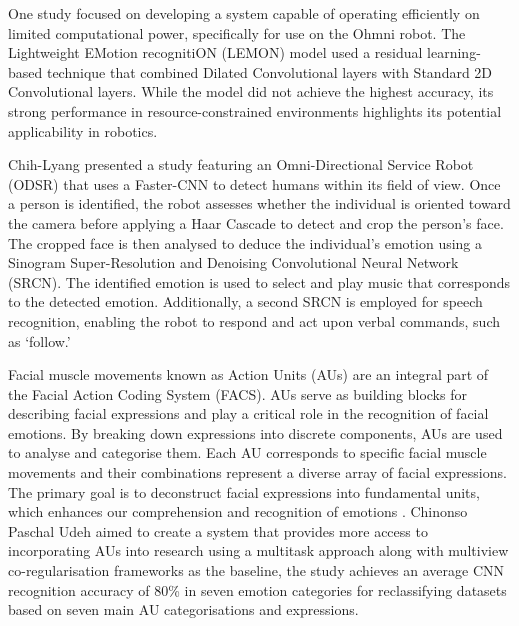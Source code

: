 One study focused on developing a system capable of operating efficiently on limited computational power, specifically for use on the Ohmni robot. The Lightweight EMotion recognitiON (LEMON) model \cite{Devaram2022-qc} used a residual learning-based technique that combined Dilated Convolutional layers with Standard 2D Convolutional layers. While the model did not achieve the highest accuracy, its strong performance in resource-constrained environments highlights its potential applicability in robotics.

Chih-Lyang \cite{9982640} presented a study featuring an Omni-Directional Service Robot (ODSR) that uses a Faster-CNN to detect humans within its field of view. Once a person is identified, the robot assesses whether the individual is oriented toward the camera before applying a Haar Cascade to detect and crop the person's face. The cropped face is then analysed to deduce the individual's emotion using a Sinogram Super-Resolution and Denoising Convolutional Neural Network (SRCN). The identified emotion is used to select and play music that corresponds to the detected emotion. Additionally, a second SRCN is employed for speech recognition, enabling the robot to respond and act upon verbal commands, such as `follow.'

Facial muscle movements known as Action Units (AUs) are an integral part of the Facial Action Coding System (FACS). AUs serve as building blocks for describing facial expressions and play a critical role in the recognition of facial emotions. By breaking down expressions into discrete components, AUs are used to analyse and categorise them. Each AU corresponds to specific facial muscle movements and their combinations represent a diverse array of facial expressions. The primary goal is to deconstruct facial expressions into fundamental units, which enhances our comprehension and recognition of emotions \cite{Mohammadpour2017-xk}. Chinonso Paschal Udeh \cite{Udeh2022-me} aimed to create a system that provides more access to incorporating AUs into research using a multitask approach along with multiview co-regularisation frameworks as the baseline, the study achieves an average CNN recognition accuracy of 80\% in seven emotion categories for reclassifying datasets based on seven main AU categorisations and expressions.

